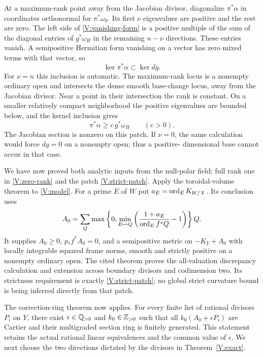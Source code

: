 At a maximum-rank point away from the Jacobian divisor, diagonalize
$\pi^*\alpha$ in coordinates orthonormal for $\pi^*\omega_0$.
Its first $\nu$ eigenvalues are positive and the rest are zero.
The left side of \eqref{V:vanishing-form} is a positive multiple of
the sum of the diagonal entries of $g^*\omega_H$ in the remaining
$n-\nu$ directions. These entries vanish. A semipositive Hermitian
form vanishing on a vector has zero mixed terms with that vector, so
\[
 \ker\pi^*\alpha\subset\ker dg.
\]
For $\nu=n$ this inclusion is automatic. The maximum-rank locus is a
nonempty ordinary open and intersects the dense smooth base-change
locus, away from the Jacobian divisor. Near a point in their intersection
the rank is constant. On a smaller relatively compact neighborhood the
positive eigenvalues are bounded below, and the kernel inclusion gives
\begin{equation}\label{V:strict-patch}
 \pi^*\alpha\ge c\,g^*\omega_H\qquad(c>0).
\end{equation}
The Jacobian section is nonzero on this patch. If $\nu=0$, the same
calculation would force $dg=0$ on a nonempty open; thus a positive-
dimensional base cannot occur in that case.

We have now proved both analytic inputs from the null-polar field:
full rank one in \eqref{V:zero-rank} and the patch
\eqref{V:strict-patch}. Apply the toroidal-volume theorem
\cite[Theorem \textup{(Toroidal volume metric)}]{CompanionG} to \eqref{V:model}.
For a prime $E$ of $W$ put $a_E=\operatorname{ord}_E K_{W/X}$. Its conclusion uses
\begin{equation}\label{V:correction}
 A_0=\sum_Q\max\left\{0,
       \min_{E\mapsto Q}\left(\frac{1+a_E}{\operatorname{ord}_E f^*Q}-1\right)
       \right\}Q.
\end{equation}
It supplies $A_0\ge0$, $p_*f^*A_0=0$, and a semipositive metric on
$-K_Y+A_0$ with locally integrable squared frame norms, smooth and
strictly positive on a nonempty ordinary open. The cited theorem proves
the all-valuation discrepancy calculation and extension across boundary
divisors and codimension two. Its strictness requirement is exactly
\eqref{V:strict-patch}; no global strict curvature bound is being
inferred directly from that patch.

The correction-ring theorem \cite[Theorem \textup{(Finite generation near a correction divisor)}]{CompanionE}
now applies. For every finite list of rational divisors $P_i$ on $Y$,
there exist $\epsilon\in\mathbb Q_{>0}$ and $k_0\in\mathbb Z_{>0}$ such that
all $k_0(A_0+\epsilon P_i)$ are Cartier and their multigraded section
ring is finitely generated. This statement retains the actual rational
linear equivalences and the common value of $\epsilon$. We next choose
the two directions dictated by the divisors in Theorem~\ref{V:exact}.
